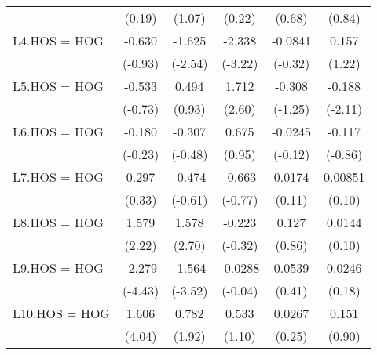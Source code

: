 {\begin{tabular}{l*{5}{c}}
                    &      (0.19)         &      (1.07)         &      (0.22)         &      (0.68)         &      (0.84)         \\
[1em]
L4.HOS = HOG        &      -0.630         &      -1.625\sym{*}  &      -2.338\sym{**} &     -0.0841         &       0.157         \\
                    &     (-0.93)         &     (-2.54)         &     (-3.22)         &     (-0.32)         &      (1.22)         \\
[1em]
L5.HOS = HOG        &      -0.533         &       0.494         &       1.712\sym{*}  &      -0.308         &      -0.188\sym{*}  \\
                    &     (-0.73)         &      (0.93)         &      (2.60)         &     (-1.25)         &     (-2.11)         \\
[1em]
L6.HOS = HOG        &      -0.180         &      -0.307         &       0.675         &     -0.0245         &      -0.117         \\
                    &     (-0.23)         &     (-0.48)         &      (0.95)         &     (-0.12)         &     (-0.86)         \\
[1em]
L7.HOS = HOG        &       0.297         &      -0.474         &      -0.663         &      0.0174         &     0.00851         \\
                    &      (0.33)         &     (-0.61)         &     (-0.77)         &      (0.11)         &      (0.10)         \\
[1em]
L8.HOS = HOG        &       1.579\sym{*}  &       1.578\sym{**} &      -0.223         &       0.127         &      0.0144         \\
                    &      (2.22)         &      (2.70)         &     (-0.32)         &      (0.86)         &      (0.10)         \\
[1em]
L9.HOS = HOG        &      -2.279\sym{***}&      -1.564\sym{***}&     -0.0288         &      0.0539         &      0.0246         \\
                    &     (-4.43)         &     (-3.52)         &     (-0.04)         &      (0.41)         &      (0.18)         \\
[1em]
L10.HOS = HOG       &       1.606\sym{***}&       0.782         &       0.533         &      0.0267         &       0.151         \\
                    &      (4.04)         &      (1.92)         &      (1.10)         &      (0.25)         &      (0.90)         \\

\end{tabular}}
